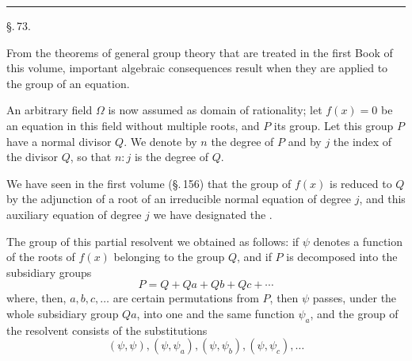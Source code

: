 
\begin{center}

\bigskip

\end{center}

\bigskip
\begin{center}
\rule{4cm}{0.4pt}
\end{center}
\bigskip

\begin{center}
\S.\,73.

\medskip

\end{center}

\bigskip

From the theorems of general group theory that are treated in the first Book of this
volume, important algebraic consequences result when they are applied to the
 group of an equation.

An arbitrary field $\Omega$ is now assumed as domain of rationality; let
$f(x) = 0$ be an equation in this field without multiple roots, and $P$ its
 group. Let this group $P$ have a normal divisor $Q$. We denote by
$n$ the degree of $P$ and by $j$ the index of the divisor $Q$, so that $n : j$ is the
degree of $Q$.

We have seen in the first volume (\S.\,156) that the group of $f(x)$ is reduced to
$Q$ by the adjunction of a root of an irreducible normal equation of degree $j$,
and this auxiliary equation of degree $j$ we have designated
the .

The  group of this partial resolvent we obtained as follows: if
$\psi$ denotes a function of the roots of $f(x)$ belonging to the group $Q$, and if $P$
is decomposed into the subsidiary groups
\[
P = Q + Qa + Qb + Qc + \cdots
\]
where, then, $a, b, c, \ldots$ are certain permutations from $P$, then $\psi$ passes,
under the whole subsidiary group $Qa$, into one and the same function $\psi_a$, and the
 group of the resolvent consists of the substitutions
\[
(\psi, \psi), (\psi, \psi_a), (\psi, \psi_b), (\psi, \psi_c), \ldots
\]
